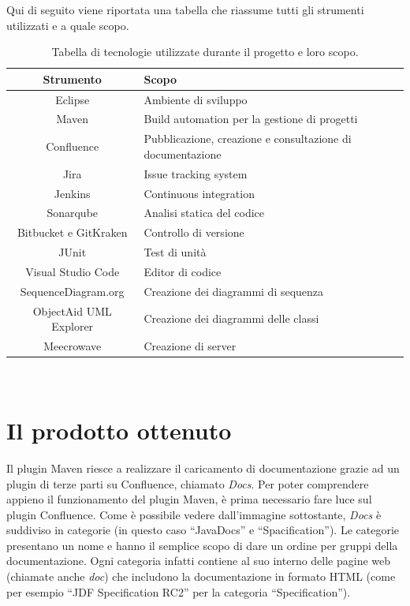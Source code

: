     Qui di seguito viene riportata una tabella che riassume tutti gli strumenti utilizzati e a quale scopo.

        \begin{table}[H]
            {\def\arraystretch{1.5}
            \begin{tabularx}{\textwidth}{c | X}
                \rowcolor{beautyblue}
                \textbf{Strumento} &
                \textbf{Scopo} \\ \hline
                Eclipse & Ambiente di sviluppo \\
                Maven & Build automation per la gestione di progetti \\
                Confluence & Pubblicazione, creazione e consultazione di documentazione \\
                Jira & Issue tracking system \\
                Jenkins & Continuous integration \\
                Sonarqube & Analisi statica del codice \\
                Bitbucket e GitKraken & Controllo di versione \\
                JUnit & Test di unità \\
                Visual Studio Code & Editor di codice \\
                SequenceDiagram.org & Creazione dei diagrammi di sequenza \\
                ObjectAid UML Explorer & Creazione dei diagrammi delle classi \\
                Meecrowave & Creazione di server \\
            \end{tabularx}} \\
        \caption{Tabella di tecnologie utilizzate durante il progetto e loro scopo.}
        \end{table}


\section{Il prodotto ottenuto} %
Il plugin Maven riesce a realizzare il caricamento di documentazione grazie ad un plugin di terze parti su Confluence, chiamato \emph{Docs}.
Per poter comprendere appieno il funzionamento del plugin Maven, è prima necessario fare luce sul plugin Confluence.
Come è possibile vedere dall'immagine sottostante, \emph{Docs} è suddiviso in categorie (in questo caso ``JavaDocs'' e ``Spacification'').
Le categorie presentano un nome e hanno il semplice scopo di dare un ordine per gruppi della documentazione.
Ogni categoria infatti contiene al suo interno delle pagine web (chiamate anche \emph{doc}) che includono la documentazione in formato HTML (come per esempio ``JDF Specification RC2'' per la categoria ``Specification'').

